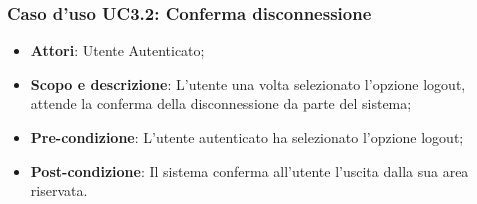 \subsubsection{Caso d'uso UC3.2: Conferma disconnessione}
	\begin{itemize}
		\item
			\textbf{Attori}: Utente Autenticato;
		\item
			\textbf{Scopo e descrizione}: L'utente una volta selezionato l'opzione logout, attende la conferma della disconnessione da parte del sistema;
 		\item
			\textbf{Pre-condizione}: L'utente autenticato ha selezionato l'opzione logout;
		\item
			\textbf{Post-condizione}: Il sistema conferma all'utente l'uscita dalla sua area riservata.
	\end{itemize}		
	